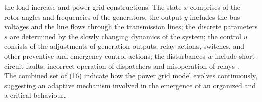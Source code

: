 \documentclass{ifacconf}
\begin{document}
the load increase and power grid constructions. 
 The state $x$ comprises 
of the rotor angles and frequencies of the generators, the output $y$ includes
the bus voltages and the line flows through the transmission lines; the discrete
parameters $s$ are determined by the slowly changing dynamics of the system; the control $u$ consists of
the adjustments of generation outputs, relay actions, switches, and other preventive
and emergency control actions; the disturbances $w$ include short-circuit faults, incorrect
operation of dispatchers and misoperation of relays \citep{Mei}. \\
The combined set of (16) indicate how the power grid model evolves continuously, suggesting an adaptive mechanism involved in the emergence of an organized and a critical behaviour. 
\end{document}
